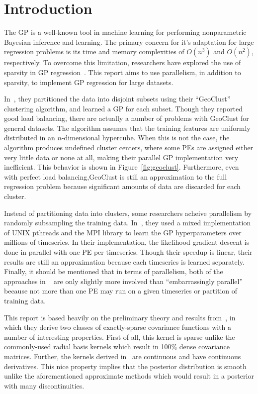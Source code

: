 \section{Introduction}
\label{sec:introduction}

The \ac{GP} is a well-known tool in machine learning for performing nonparametric Bayesian
inference and learning.  The primary concern for it's adaptation for large regression
problems is its time and memory complexities of $O(n^3)$ and $O(n^2)$, respectively.  To
overcome this limitation, researchers have explored the use of sparsity in \ac{GP}
regression~\cite{lawrence2002fast,seeger2003fast,smola2001sparse,williams2001using}.  This
report aims to use parallelism, in addition to sparsity, to implement \ac{GP} regression
for large datasets.

In~\cite{keane2002data}, they partitioned the data into disjoint subsets using their
``GeoClust'' clustering algorithm, and learned a \ac{GP} for each subset.  Though they
reported good load balancing, there are actually a number of problems with GeoClust for
general datasets.  The algorithm assumes that the training features are uniformly
distributed in an $n$-dimensional hypercube.  When this is not the case, the algorithm
produces undefined cluster centers, where some \acp{PE} are assigned either very little
data or none at all, making their parallel \ac{GP} implementation very inefficient.  This
behavior is shown in Figure~\ref{fig:geoclust}.  Furthermore, even with perfect load
balancing,GeoClust is still an approximation to the full regression problem because
significant amounts of data are discarded for each cluster.

Instead of partitioning data into clusters, some researchers acheive parallelism by
randomly subsampling the training data.  In~\cite{chandola2011implementing}, they used a
mixed implementation of UNIX pthreads and the \ac{MPI} library to learn the \ac{GP}
hyperparameters over millions of timeseries.  In their implementation, the likelihood
gradient descent is done in parallel with one \ac{PE} per timeseries.  Though their
speedup is linear, their results are still an approximation because each timeseries is
learned separately.  Finally, it should be mentioned that in terms of parallelism, both of
the approaches in ~\cite{keane2002data, chandola2011implementing} are only slightly more
involved than ``embarrassingly parallel'' because not more than one \ac{PE} may run on a
given timeseries or partition of training data.

This report is based heavily on the preliminary theory and results
from~\cite{melkumyan2009sparse}, in which they derive two classes of exactly-sparse
covariance functions with a number of interesting properties.  First of all, this kernel
is sparse unlike the commonly-used radial basis kernels which result in 100\% dense
covariance matrices.  Further, the kernels derived in~\cite{melkumyan2009sparse} are
continuous and have continuous derivatives.  This nice property implies that the posterior
distribution is smooth unlike the aforementioned approximate methods which would result in
a posterior with many discontinuities.

